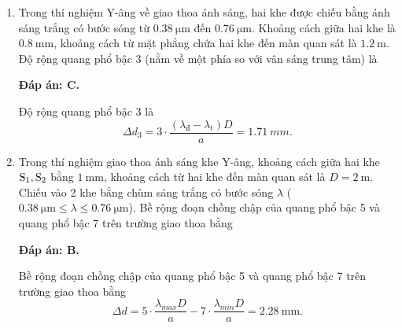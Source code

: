 \begin{enumerate}[label=\bfseries Câu \arabic*:]
{	}
	
	\item {} 
		\cauhoi
	{Trong thí nghiệm Y-âng về giao thoa ánh sáng, hai khe được chiếu bằng ánh sáng trắng có bước sóng từ $\SI{0.38}{\micro \meter}$ đến $\SI{0.76}{\micro \meter}$. Khoảng cách giữa hai khe là $\SI{0.8}{\milli \meter}$, khoảng cách từ mặt phẳng chứa hai khe đến màn quan sát là $\SI{1.2}{\meter}$. Độ rộng quang phổ bậc 3 (nằm về một phía so với vân sáng trung tâm) là
	}
	
	\loigiai
	{		\textbf{Đáp án: C.}
		
Độ rộng quang phổ bậc 3 là
$$
	\Delta d_{3} = 3 \cdot \dfrac{(\lambda_{\text{đ}} - \lambda_{\text{t}})D}{a} = \SI{1,71}{mm}.
$$
		
	}
	
	\item {} 
		\cauhoi
	{Trong thí nghiệm giao thoa ánh sáng khe Y-âng, khoảng cách giữa hai khe $\text S_1, \text S_2$ bằng $\SI{1}{\milli \meter}$, khoảng cách từ hai khe đến màn quan sát là $D=\SI{2}{\meter}$. Chiếu vào 2 khe bằng chùm sáng trắng có bước sóng $\lambda$ ($\SI{0.38}{\micro \meter} \leq \lambda \leq \SI{0.76}{\micro \meter}$). Bề rộng đoạn chồng chập của quang phổ bậc 5 và quang phổ bậc 7 trên trường giao thoa bằng
	}
	
	\loigiai
	{		\textbf{Đáp án: B.}
		
Bề rộng đoạn chồng chập của quang phổ bậc 5 và quang phổ bậc 7 trên trường giao thoa bằng
$$
	\Delta d = 5 \cdot \dfrac{\lambda_{max} D}{a} - 7 \cdot \dfrac{\lambda_{min} D}{a} = \SI{2.28}{\milli \meter}. 
$$
			
	}
	

\end{enumerate}
